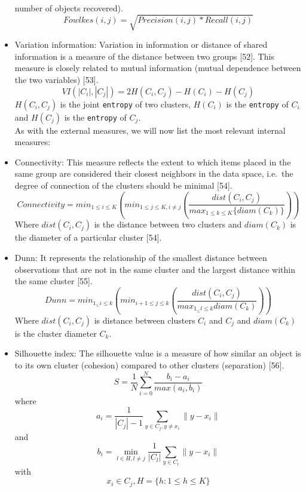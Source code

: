 \documentclass[
]{article}
\begin{document}
\begin{itemize}
  number of objects recovered). \begin{equation}
        Fowlkes(i,j) = \sqrt{Precision(i,j) * Recall(i,j)}
    \end{equation}
\item
  Variation information: Variation in information or distance of shared
  information is a measure of the distance between two groups {[}52{]}.
  This measure is closely related to mutual information (mutual
  dependence between the two variables) {[}53{]}. \begin{equation}
       VI(|C_{i}|,|C_{j}|) = 2H(C_{i},C_{j}) - H(C_{i}) - H(C_{j})
    \end{equation} \(H(C_{i},C_{j})\) is the joint \texttt{entropy} of
  two clusters, \(H(C_{i})\) is the \texttt{entropy} of \(C_{i}\) and
  \(H(C_{j})\) is the \texttt{entropy} of \(C_{j}\).\\
  As with the external measures, we will now list the most relevant
  internal measures:
\item
  Connectivity: This measure reflects the extent to which items placed
  in the same group are considered their closest neighbors in the data
  space, i.e.~the degree of connection of the clusters should be minimal
  {[}54{]}. \begin{equation}
        Connectivity = min_{ 1\leq i \leq K} \left( min_{1\leq j \leq K, i\not= j} \left( \frac{dist(C_i,C_j)}{max_{1\leq k \leq K} \lbrace diam(C_k) \rbrace }  \right) \right)
    \end{equation} Where \(dist(C_i,C_j)\) is the distance between two
  clusters and \(diam(C_k)\) is the diameter of a particular cluster
  {[}54{]}.
\item
  Dunn: It represents the relationship of the smallest distance between
  observations that are not in the same cluster and the largest distance
  within the same cluster {[}55{]}. \begin{equation}
    Dunn =  min_{1_\leq i\leq k} \left( min_{i+1\leq j \leq k}  \left( \frac{dist(C_i,C_j)}{max_{1_\leq l \leq k} diam(C_{k})} \right) \right)
    \end{equation} Where \(dist(C_{i},C_{j})\) is distance between
  clusters \(C_{i}\) and \(C_{j}\) and \(diam(C_{k})\) is the cluster
  diameter \(C_{k}\).\\
\item
  Silhouette index: The silhouette value is a measure of how similar an
  object is to its own cluster (cohesion) compared to other clusters
  (separation) {[}56{]}. \begin{equation}
        S = \frac{1}{N}\sum_{i=0}^{N}\frac{b_{i} - a_{i}}{max(a_{i},b_{i})}
    \end{equation} where
  \[a_{i}=\frac{1}{|C_{j}| - 1} \sum_{y\in C_{j},y\neq x_{i}}^{}\|y-x_{i}\|\]
  and
  \[ b_{i} = \min\limits_{l \in H, l\neq j}^{} \frac{1}{|C_{l}|} \sum_{y \in C_{l}}^{} \| y - x_{i} \| \]
  with \[ x_{i} \in C_{j}, H = \{h: 1 \leq h \leq K\}\]
\end{itemize}
\end{document}
